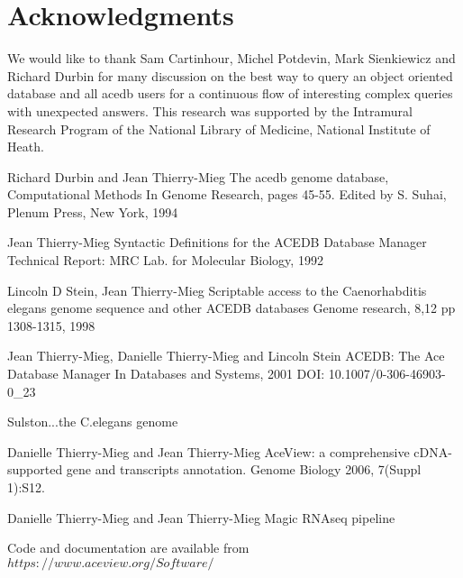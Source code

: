 \documentclass[11pt]{article}
\begin{document}

\section*{Acknowledgments}

We would like to thank Sam Cartinhour, Michel Potdevin, Mark Sienkiewicz and Richard Durbin
for many discussion on the best way to query an object oriented database
and all acedb users for a continuous flow of interesting complex queries
with unexpected answers.
This research was supported by the Intramural Research Program of the National Library of Medicine, National Institute of Heath.

\begin{thebibliography}{99}

\bibitem {[1]}
Richard Durbin and Jean Thierry-Mieg
The acedb genome database,
Computational Methods In Genome Research, pages 45-55.
Edited by S. Suhai, Plenum Press, New York, 1994

Jean Thierry-Mieg
Syntactic Definitions for the ACEDB Database Manager
Technical Report: MRC Lab. for Molecular Biology, 1992

\bibitem {[2]}
Lincoln D Stein, Jean Thierry-Mieg
Scriptable access to the Caenorhabditis elegans genome sequence and other ACEDB databases
Genome research, 8,12 pp 1308-1315, 1998

\bibitem {[2]}
Jean Thierry-Mieg, Danielle Thierry-Mieg and Lincoln Stein
ACEDB: The Ace Database Manager
In Databases and Systems, 2001
DOI: 10.1007/0-306-46903-0\_23


\bibitem{[3]}
Sulston...the C.elegans genome

\bibitem{[3]}
Danielle Thierry-Mieg and Jean Thierry-Mieg
AceView: a comprehensive cDNA-supported gene and transcripts annotation.
Genome Biology 2006, 7(Suppl 1):S12.  

\bibitem{[4]}
Danielle Thierry-Mieg and Jean Thierry-Mieg
Magic RNAseq pipeline


\bibitem{[3]}
Code and documentation are available from  \\
$https://www.aceview.org/Software/$

\end{thebibliography}
\end{document}
